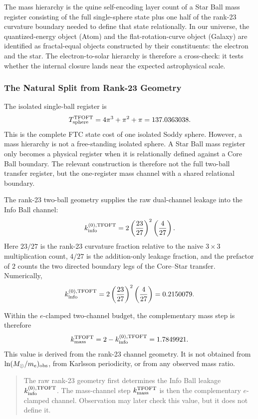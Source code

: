 \documentclass[11pt,a4paper]{article}
\begin{document}
The mass hierarchy is the quine self-encoding layer count of a Star Ball mass register consisting of the full single-sphere state plus one half of the rank-23 curvature boundary needed to define that state relationally. In our universe, the quantized-energy object (Atom) and the flat-rotation-curve object (Galaxy) are identified as fractal-equal objects constructed by their constituents: the electron and the star. The electron-to-solar hierarchy is therefore a cross-check: it tests whether the internal closure lands near the expected astrophysical scale.

\subsubsection{The Natural Split from Rank-23 Geometry}
\label{sec:natural_split}

The isolated single-ball register is
\[
T_{\rm sphere}^{\rm TFOFT}
=
4\pi^3+\pi^2+\pi
=
137.0363038.
\]
This is the complete FTC state cost of one isolated Soddy sphere.
However, a mass hierarchy is not a free-standing isolated sphere. A Star Ball
mass register only becomes a physical register when it is relationally
defined against a Core Ball boundary. The relevant construction is therefore
not the full two-ball transfer register, but the one-register mass channel
with a shared relational boundary.

The rank-23 two-ball geometry supplies the raw dual-channel leakage into the
Info Ball channel:
\[
k_{\rm info}^{(0),{\rm TFOFT}}
=
2\left(\frac{23}{27}\right)^2\left(\frac{4}{27}\right).
\]
Here \(23/27\) is the rank-23 curvature fraction relative to the naive
\(3\times3\) multiplication count, \(4/27\) is the addition-only leakage
fraction, and the prefactor of \(2\) counts the two directed boundary legs of
the Core--Star transfer. Numerically,
\[
k_{\rm info}^{(0),{\rm TFOFT}}
=
2\left(\frac{23}{27}\right)^2\left(\frac{4}{27}\right)
=
0.2150079.
\]

Within the \(e\)-clamped two-channel budget, the complementary mass step is
therefore
\[
k_{\rm mass}^{\rm TFOFT}
=
2-k_{\rm info}^{(0),{\rm TFOFT}}
=
1.7849921.
\]
This value is derived from the rank-23 channel geometry. It is not obtained
from \(\ln(M_\odot/m_e)_{\rm obs}\), from Karlsson periodicity, or from any
observed mass ratio.

\begin{quote}
The raw rank-23 geometry first determines the Info Ball leakage
\(k_{\rm info}^{(0),{\rm TFOFT}}\). The mass-channel step
\(k_{\rm mass}^{\rm TFOFT}\) is then the complementary \(e\)-clamped channel.
Observation may later check this value, but it does not define it.
\end{quote}
\end{document}
